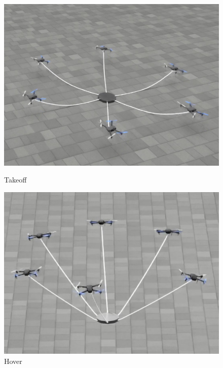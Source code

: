 \documentclass[12pt,twoside,letterpaper]{article}
\begin{document}
\begin{figure}[H]
    \centering
    \begin{minipage}{0.32\textwidth}
        \centering
        \includegraphics[width=\linewidth]{figures/takeoff.jpg}
        \caption{Takeoff}
        \label{fig:takeoff}
    \end{minipage}
    \hfill
    \begin{minipage}{0.32\textwidth}
        \centering
        \includegraphics[width=\linewidth]{figures/hover.jpg}
        \caption{Hover}
        \label{fig:hover}
    \end{minipage}
    \hfill
    \begin{minipage}{0.32\textwidth}
        \centering

\end{minipage}
\end{figure}
\end{document}
